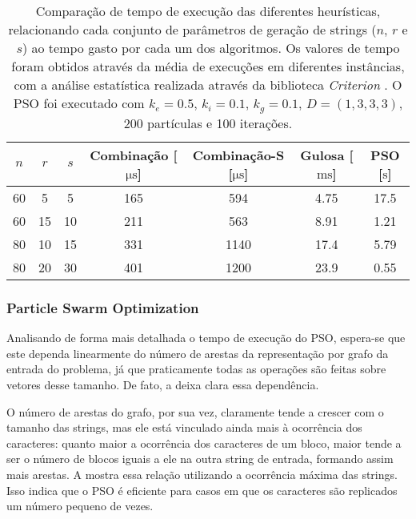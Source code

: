     \begin{table}[htb]
        \centering
        \begin{tabular}{ccc|cccc}
            \toprule
            $n$ & $r$ & $s$ & Combinação [$\unit{\micro\second}$] & Combinação-S [$\unit{\micro\second}$] & Gulosa [$\unit{\milli\second}$] & PSO [$\unit{\second}$] \\
            \midrule
            60 &  5 &  5 & 165 & 594  & 4.75 & 17.5 \\
            60 & 15 & 10 & 211 & 563  & 8.91 & 1.21 \\
            80 & 10 & 15 & 331 & 1140 & 17.4 & 5.79 \\
            80 & 20 & 30 & 401 & 1200 & 23.9 & 0.55 \\
            \bottomrule
        \end{tabular}

        \caption{Comparação de tempo de execução das diferentes heurísticas, relacionando cada conjunto de parâmetros de geração de strings ($n$, $r$ e $s$) ao tempo gasto por cada um dos algoritmos. Os valores de tempo foram obtidos através da média de execuções em diferentes instâncias, com a análise estatística realizada através da biblioteca \textit{Criterion} \cite{noauthor_criterion_nodate}. O PSO foi executado com $k_e = 0.5$, $k_i = 0.1$, $k_g = 0.1$, $D = (1, 3, 3, 3)$, 200 partículas e 100 iterações.}
        \label{tab:bench-tempo}
    \end{table}

    \subsubsection{Particle Swarm Optimization} \label{sec:tempo-pso}

        Analisando de forma mais detalhada o tempo de execução do PSO, espera-se que este dependa linearmente do número de arestas da representação por grafo da entrada do problema, já que praticamente todas as operações são feitas sobre vetores desse tamanho. De fato, a  deixa clara essa dependência.

        O número de arestas do grafo, por sua vez, claramente tende a crescer com o tamanho das strings, mas ele está vinculado ainda mais à ocorrência dos caracteres: quanto maior a ocorrência dos caracteres de um bloco, maior tende a ser o número de blocos iguais a ele na outra string de entrada, formando assim mais arestas. A  mostra essa relação utilizando a ocorrência máxima das strings. Isso indica que o PSO é eficiente para casos em que os caracteres são replicados um número pequeno de vezes.

